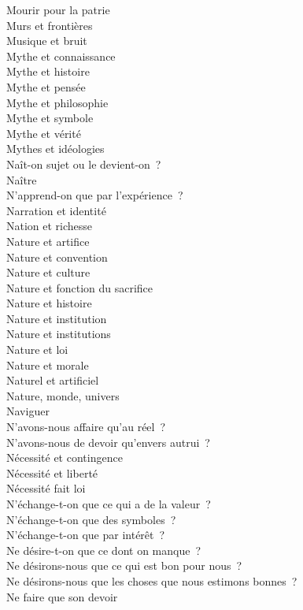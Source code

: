 \documentclass[a4paper,12pt]{article}
\begin{document}
Mourir pour la patrie \\
Murs et frontières \\
Musique et bruit \\
Mythe et connaissance \\
Mythe et histoire \\
Mythe et pensée \\
Mythe et philosophie \\
Mythe et symbole \\
Mythe et vérité \\
Mythes et idéologies \\
Naît-on sujet ou le devient-on ? \\
Naître \\
N'apprend-on que par l'expérience ? \\
Narration et identité \\
Nation et richesse \\
Nature et artifice \\
Nature et convention \\
Nature et culture \\
Nature et fonction du sacrifice \\
Nature et histoire \\
Nature et institution \\
Nature et institutions \\
Nature et loi \\
Nature et morale \\
Naturel et artificiel \\
Nature, monde, univers \\
Naviguer \\
N'avons-nous affaire qu'au réel ? \\
N'avons-nous de devoir qu'envers autrui ? \\
Nécessité et contingence \\
Nécessité et liberté \\
Nécessité fait loi \\
N'échange-t-on que ce qui a de la valeur ? \\
N'échange-t-on que des symboles ? \\
N'échange-t-on que par intérêt ? \\
Ne désire-t-on que ce dont on manque ? \\
Ne désirons-nous que ce qui est bon pour nous ? \\
Ne désirons-nous que les choses que nous estimons bonnes ? \\
Ne faire que son devoir \\
\end{document}
